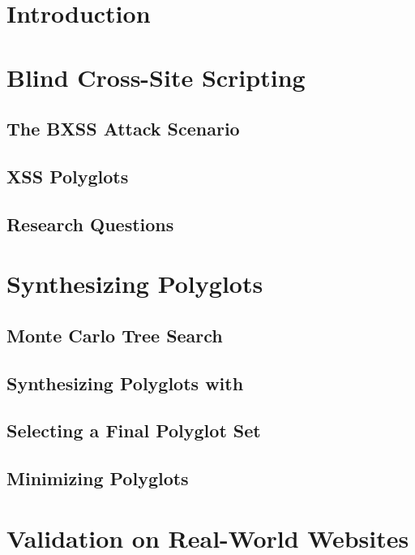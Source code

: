 \documentclass[letterpaper,twocolumn,10pt]{article}
\begin{document}
\section{Introduction}

\section{Blind Cross-Site Scripting}

\subsection{The BXSS Attack Scenario}

\subsection{XSS Polyglots}

\subsection{Research Questions}

\section{Synthesizing Polyglots}

\subsection{Monte Carlo Tree Search}

\subsection{Synthesizing Polyglots with \mcts {}}

\subsection{Selecting a Final Polyglot Set}

\subsection{Minimizing Polyglots}

\section{Validation on Real-World Websites}
\end{document}

